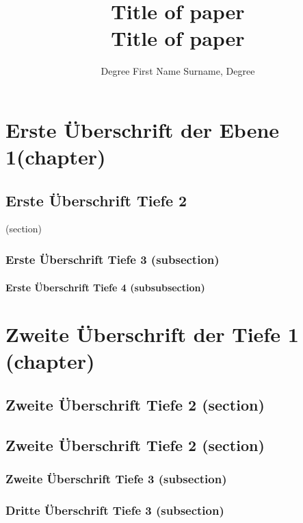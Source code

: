 \documentclass[Bachelor, BBE, english]{twbook}
\title{Title of paper\\Title of paper}
\author{Degree First Name Surname, Degree}
\begin{document}
\maketitle

\Blinddocument

\chapter{Erste Überschrift der Ebene 1(chapter)}
\blinddocument

\blindmathpaper

\section{Erste Überschrift Tiefe 2}(section)
\blindtext 

\subsection{Erste Überschrift Tiefe 3 (subsection)}
\blindtext 

\subsubsection{Erste Überschrift Tiefe 4 (subsubsection)}
\blindtext

\chapter{Zweite Überschrift der Tiefe 1 (chapter)}
\blindtext  

\section{Zweite Überschrift Tiefe 2 (section)}
\blindtext  

\section{Zweite Überschrift Tiefe 2 (section)}
\blindtext 

\subsection{Zweite Überschrift Tiefe 3 (subsection)}
\blindtext 

\subsection{Dritte Überschrift Tiefe 3 (subsection)}
\blindtext 
 
\end{document}
